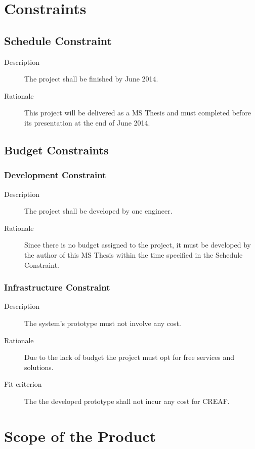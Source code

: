\section{Constraints} \label{constraints}
\subsection{Schedule Constraint}

\begin{description}
\item[Description] The project shall be finished by June 2014.
\item[Rationale] This project will be delivered as a MS Thesis and must completed before its presentation at the end of June 2014.
\end{description}

\subsection{Budget Constraints}

\subsubsection{Development Constraint}

\begin{description}
\item[Description] The project shall be developed by one engineer.
\item[Rationale] Since there is no budget assigned to the project, it must be developed by the author of this MS Thesis within the time specified in the Schedule Constraint.
\end{description}

\subsubsection{Infrastructure Constraint}

\begin{description}
\item[Description] The system's prototype must not involve any cost.
\item[Rationale] Due to the lack of budget the project must opt for free services and solutions.
\item[Fit criterion] The the developed prototype shall not incur any cost for CREAF.
\end{description}

\section{Scope of the Product}

